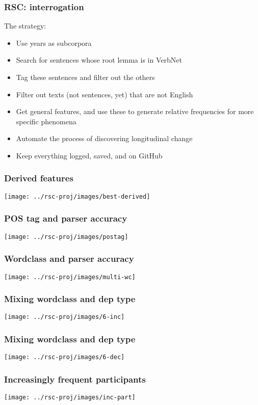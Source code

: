\documentclass{beamer}       %
\begin{document}
\begin{frame}
\frametitle{RSC: interrogation}

The strategy:

\begin{itemize}
    \item Use years as subcorpora
    \item Search for sentences whose root lemma is in VerbNet
    \item Tag these sentences and filter out the others
    \item Filter out texts (not sentences, yet) that are not English
    \item Get general features, and use these to generate relative frequencies for more specific phenomena
    \item Automate the process of discovering longitudinal change
    \item Keep everything logged, saved, and on GitHub
\end{itemize}
\end{frame}

\begin{frame}
    \frametitle{Derived features}
    \centering
    \texttt{[image: ../rsc-proj/images/best-derived]}
\end{frame}

\begin{frame}
    \frametitle{POS tag and parser accuracy}
    \centering
    \texttt{[image: ../rsc-proj/images/postag]}
\end{frame}

\begin{frame}
    \frametitle{Wordclass and parser accuracy}
    \centering
    \texttt{[image: ../rsc-proj/images/multi-wc]}
\end{frame}

\begin{frame}
    \frametitle{Mixing wordclass and dep type}
    \centering
    \texttt{[image: ../rsc-proj/images/6-inc]}
\end{frame}

\begin{frame}
    \frametitle{Mixing wordclass and dep type}
    \centering
    \texttt{[image: ../rsc-proj/images/6-dec]}
\end{frame}

\begin{frame}
    \frametitle{Increasingly frequent participants}
    \centering
    \texttt{[image: ../rsc-proj/images/inc-part]}
\end{frame}
\end{document}
